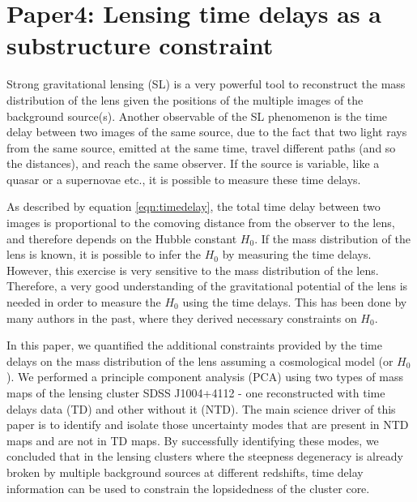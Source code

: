 \chapter{Paper4: Lensing time delays as a substructure constraint}\label{paper:timedelays}

Strong gravitational lensing (SL) is a very powerful tool to reconstruct the mass distribution
of the lens given the positions of the multiple images of the background source(s). 
Another observable
of the SL phenomenon is the time delay between two images of the same source,
due to the fact that two light rays from the same source, emitted at the
same time, travel different paths (and so the distances), and reach the same observer. 
If the source is variable, like a quasar or a supernovae etc., 
it is possible to measure these time delays. 

As described by equation \ref{eqn:timedelay}, 
the total time delay between two images 
is proportional to the comoving distance from the observer to the lens, 
and therefore depends
on the Hubble constant $H_0$. If the mass distribution of the lens
is known, it is possible to infer the $H_0$ by measuring the time delays.
However, this exercise is very sensitive to the mass distribution of the 
lens. Therefore, a very good understanding of the gravitational potential
of the lens is needed in order to measure the $H_0$ using the time delays.
This has been done by many authors in the past, where they derived necessary
constraints on $H_0$.

In this paper, we quantified the additional constraints provided by the time delays
on the mass distribution of the lens assuming a cosmological model (or $H_0$). 
We performed a principle component analysis (PCA)
using two types of mass maps of the lensing cluster SDSS J1004+4112 - one 
reconstructed with time delays data (TD) and other without it (NTD). The main
science driver of this paper is to identify and isolate those 
uncertainty modes that are present in NTD maps and are not in TD maps.
By successfully identifying these modes, we concluded that in the lensing clusters
where the steepness degeneracy is already broken by multiple background sources
at different redshifts, time delay information can be used to constrain
the lopsidedness of the cluster core.

